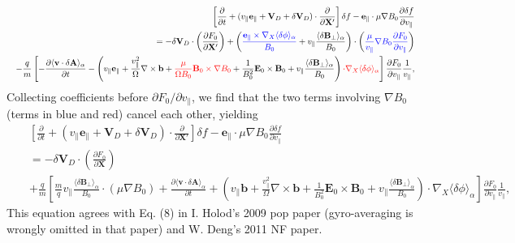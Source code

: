 \documentclass{article}
\newcommand{\tmcolor}[2]{{\color{#1}{#2}}}
\begin{document}
\begin{eqnarray}
  &  & \left[ \frac{\partial}{\partial t} + (v_{\parallel}
  \mathbf{e}_{\parallel} +\mathbf{V}_D + \delta \mathbf{V}_D) \cdot
  \frac{\partial}{\partial \mathbf{X}'} \right] \delta f
  -\mathbf{e}_{\parallel} \cdot \mu \nabla B_0 \frac{\partial \delta
  f}{\partial v_{\parallel}} \nonumber\\
  &  & = - \delta \mathbf{V}_D \cdot \left( \frac{\partial F_0}{\partial
  \mathbf{X}'} \right) + \left( \tmcolor{blue}{\frac{\mathbf{e}_{\parallel}
  \times \nabla_X \langle \delta \phi \rangle_{\alpha}}{B_0}} + v_{\parallel}
  \frac{\langle \delta \mathbf{B}_{\perp} \rangle_{\alpha}}{B_0} \right) \cdot
  \left( \tmcolor{blue}{\frac{\mu}{v_{\parallel}} \nabla B_0 \frac{\partial
  F_0}{\partial v_{\parallel}}} \right) \nonumber\\
  &  & - \frac{q}{m} \left[ - \frac{\partial \langle \mathbf{v} \cdot \delta
  \mathbf{A} \rangle_{\alpha}}{\partial t} - \left( v_{\parallel}
  \mathbf{e}_{\parallel} + \frac{v_{\parallel}^2}{\Omega} \nabla \times
  \mathbf{b}+ \tmcolor{red}{\frac{\mu}{\Omega B_0} \mathbf{B}_0 \times \nabla
  B_0} + \frac{1}{B_0^2} \mathbf{E}_0 \times \mathbf{B}_0 + v_{\parallel}
  \frac{\langle \delta \mathbf{B}_{\perp} \rangle_{\alpha}}{B_0} \right)
  \tmcolor{red}{\cdot \nabla_X \langle \delta \phi \rangle_{\alpha}} \right]
  \frac{\partial F_0}{\partial v_{\parallel}}  \frac{1}{v_{\parallel}}, 
\end{eqnarray}
Collecting coefficients before $\partial F_0 / \partial v_{\parallel}$, we
find that the two terms involving $\nabla B_0$ (terms in blue and red) cancel
each other, yielding
\begin{eqnarray}
  &  & \left[ \frac{\partial}{\partial t} + (v_{\parallel}
  \mathbf{e}_{\parallel} +\mathbf{V}_D + \delta \mathbf{V}_D) \cdot
  \frac{\partial}{\partial \mathbf{X}'} \right] \delta f
  -\mathbf{e}_{\parallel} \cdot \mu \nabla B_0 \frac{\partial \delta
  f}{\partial v_{\parallel}} \nonumber\\
  &  & = - \delta \mathbf{V}_D \cdot \left( \frac{\partial F_0}{\partial
  \mathbf{X}} \right) \nonumber\\
  &  & + \frac{q}{m} \left[ \frac{m}{q} v_{\parallel} \frac{\langle \delta
  \mathbf{B}_{\perp} \rangle_{\alpha}}{B_0} \cdot (\mu \nabla B_0) +
  \frac{\partial \langle \mathbf{v} \cdot \delta \mathbf{A}
  \rangle_{\alpha}}{\partial t} + \left( v_{\parallel} \mathbf{b}+
  \frac{v_{\parallel}^2}{\Omega} \nabla \times \mathbf{b}+ \frac{1}{B_0^2}
  \mathbf{E}_0 \times \mathbf{B}_0 + v_{\parallel} \frac{\langle \delta
  \mathbf{B}_{\perp} \rangle_{\alpha}}{B_0} \right) \cdot \nabla_X \langle
  \delta \phi \rangle_{\alpha} \right] \frac{\partial F_0}{\partial
  v_{\parallel}}  \frac{1}{v_{\parallel}},  \label{18-9-18-e1}
\end{eqnarray}
This equation agrees with Eq. (8) in I. Holod's 2009 pop paper (gyro-averaging
is wrongly omitted in that paper) and W. Deng's 2011 NF paper.
\end{document}
